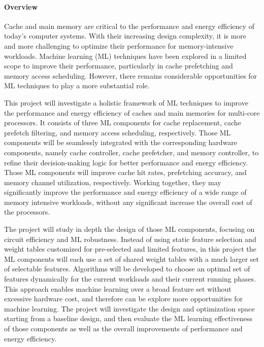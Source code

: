 \documentclass[11pt]{article}
\begin{document}
\thispagestyle{empty}

\paragraph*{Overview}


Cache and main memory are critical to the performance and energy efficiency of
today's computer systems.  With their increasing design complexity, it is more
and more challenging to optimize their performance for memory-intensive
workloads.  Machine learning (ML) techniques have been explored in a limited
scope to improve their performance, particularly in cache prefetching and memory
access scheduling. However, there remains considerable opportunities for ML
techniques to play a more substantial role.

This project will investigate a holistic framework of ML techniques to improve
the performance and energy efficiency of caches and main memories for multi-core
processors.  It consists of three ML components for cache replacement, cache
prefetch filtering, and memory access scheduling, respectively.  Those ML
components will be seamlessly integrated with the corresponding hardware
components, namely cache controller, cache prefetcher, and memory controller, to
refine their decision-making logic for better performance and energy efficiency.
Those ML components will improve cache hit rates, prefetching accuracy, and
memory channel utilization, respectively.  Working together, they may
significantly improve the performance and energy efficiency of a wide range of
memory intensive workloads, without any significant increase the overall cost
of the processors.

The project will study in depth the design of those ML components, focusing on
circuit efficiency and ML robustness.  Instead of using static feature selection
and weight tables customized for pre-selected and limited features, in this
project the ML components will each use a set of shared weight tables with a
much larger set of selectable features.  Algorithms will be developed to choose
an optimal set of features dynamically for the current workloads and their
current running phases. This approach enables machine learning over a broad
feature set without excessive hardware cost, and therefore can be explore more
opportunities for machine learning.  The project will investigate the design and
optimization space starting from a baseline design, and then evaluate the ML
learning effectiveness of those components as well as the overall improvements
of performance and energy efficiency.
\end{document}
